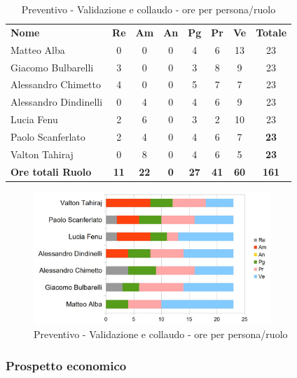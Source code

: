 		\begin{table} [h!]
			\begin{center}
				\begin{tabular} { m{3.5cm} c c c c c c c }
					\rowcolor{lightgray}
					\textbf{Nome} & \textbf{Re} & \textbf{Am} & \textbf{An} & \textbf{Pg} & \textbf{Pr} & \textbf{Ve} & \textbf{Totale} \\
					Matteo Alba & 0 & 0 & 0 & 4 & 6 & 13 & 23 \\
					Giacomo Bulbarelli & 3 & 0 & 0 & 3 & 8 & 9 & 23 \\
					Alessandro Chimetto & 4 & 0 & 0 & 5 & 7 & 7 & 23 \\
					Alessandro Dindinelli & 0 & 4 & 0 & 4 & 6 & 9 & 23 \\
					Lucia Fenu & 2 & 6 & 0 & 3 & 2 & 10 & 23 \\
					Paolo Scanferlato & 2 & 4 & 0 & 4 & 6 & 7 & \textbf{23} \\
					Valton Tahiraj & 0 & 8 & 0 & 4 & 6 & 5 & \textbf{23} \\
					\textbf{Ore totali Ruolo} & \textbf{11} & \textbf{22} & \textbf{0} & \textbf{27} & \textbf{41}& \textbf{60} & \textbf{161}
				\end{tabular}
				\caption{Preventivo - Validazione e collaudo - ore per persona/ruolo}
			\end{center}
		\end{table}
	
		\begin{figure} [h!]
			\centering
			\includegraphics[width=0.8\textwidth]{res/img/grafici/ValidazioneECollaudoOre.jpg}
			\caption{Preventivo - Validazione e collaudo - ore per persona/ruolo} 
		\end{figure}
	
	\newpage
	
	\subsubsection{Prospetto economico}
	

